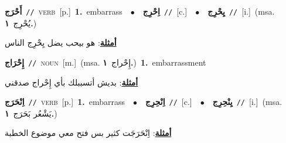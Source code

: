 \documentclass[10pt,a4paper,twoside]{article} %
\begin{document}
\begin{multicols}{2}
{\setlength\topsep{0pt}\textbf{\foreignlanguage{arabic}{أَحْرَج}}\ {\color{gray}\texttt{//}\color{black}}\ \textsc{verb}\ [p.]\ \textbf{1.}~embarrass\ \ $\bullet$\ \ \setlength\topsep{0pt}\textbf{\foreignlanguage{arabic}{اِحْرِج}}\ {\color{gray}\texttt{//}\color{black}}\ [c.]\ \ $\bullet$\ \ \setlength\topsep{0pt}\textbf{\foreignlanguage{arabic}{يِحْرِج}}\ {\color{gray}\texttt{//}\color{black}}\ [i.]\ \color{gray}(msa. \foreignlanguage{arabic}{يُحْرِج}~\foreignlanguage{arabic}{\textbf{١.}})\color{black}\  \begin{flushright}\color{gray}\foreignlanguage{arabic}{\textbf{\underline{\foreignlanguage{arabic}{أمثلة}}}: هو بيحب يضل يِحْرِج الناس}\end{flushright}\color{black}} \vspace{2mm}

{\setlength\topsep{0pt}\textbf{\foreignlanguage{arabic}{إِحْرَاج}}\ {\color{gray}\texttt{//}\color{black}}\ \textsc{noun}\ [m.]\ \color{gray}(msa. \foreignlanguage{arabic}{إِحْراج}~\foreignlanguage{arabic}{\textbf{١.}})\color{black}\ \textbf{1.}~embarrassment\  \begin{flushright}\color{gray}\foreignlanguage{arabic}{\textbf{\underline{\foreignlanguage{arabic}{أمثلة}}}: بديش أتسببلك بأي إِحْراج صدقني}\end{flushright}\color{black}} \vspace{2mm}

{\setlength\topsep{0pt}\textbf{\foreignlanguage{arabic}{اِنْحَرَج}}\ {\color{gray}\texttt{//}\color{black}}\ \textsc{verb}\ [p.]\ \textbf{1.}~embarrass\ \ $\bullet$\ \ \setlength\topsep{0pt}\textbf{\foreignlanguage{arabic}{اِنْحِرِج}}\ {\color{gray}\texttt{//}\color{black}}\ [c.]\ \ $\bullet$\ \ \setlength\topsep{0pt}\textbf{\foreignlanguage{arabic}{يِنْحِرِج}}\ {\color{gray}\texttt{//}\color{black}}\ [i.]\ \color{gray}(msa. \foreignlanguage{arabic}{يَشْعُر بَحَرَج}~\foreignlanguage{arabic}{\textbf{١.}})\color{black}\  \begin{flushright}\color{gray}\foreignlanguage{arabic}{\textbf{\underline{\foreignlanguage{arabic}{أمثلة}}}: اِنْحَرَجَت كثير بس فتح معي موضوع الخطبة}\end{flushright}\color{black}} \vspace{2mm}


\end{multicols}
\end{document}
